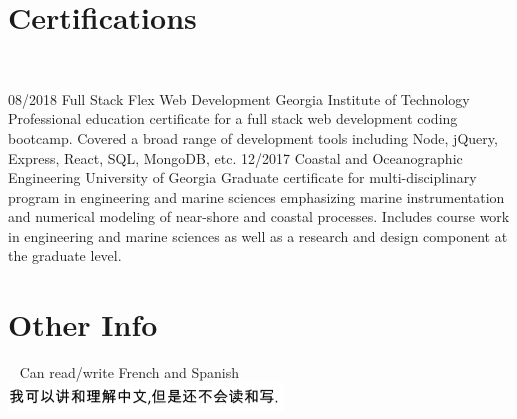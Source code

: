 \documentclass[]{resume}
\begin{document}
\begin{body}
	\section{Certifications}
	~
    	\begin{entrylist}
    		\entry
    		{08/2018}
    		{Full Stack Flex Web Development}
    		{Georgia Institute of Technology}
    		{Professional education certificate for a full stack web development coding bootcamp. Covered a broad range of development tools including Node, jQuery, Express, React, SQL, MongoDB, etc.}
    		\entry
    		{12/2017}
    		{Coastal and Oceanographic Engineering}
    		{University of Georgia}
    		{Graduate certificate for multi-disciplinary program in engineering and marine sciences emphasizing marine instrumentation and numerical modeling of near-shore and coastal processes. Includes course work in engineering and marine sciences as well as a research and design component at the graduate level.}
    	\end{entrylist}
	\section{Other Info}
    	~
    	Can read/write French and Spanish\\
    	\emph{\includegraphics[scale=1]{img/Chinese.PNG}}\\

\end{body}
\end{document}
